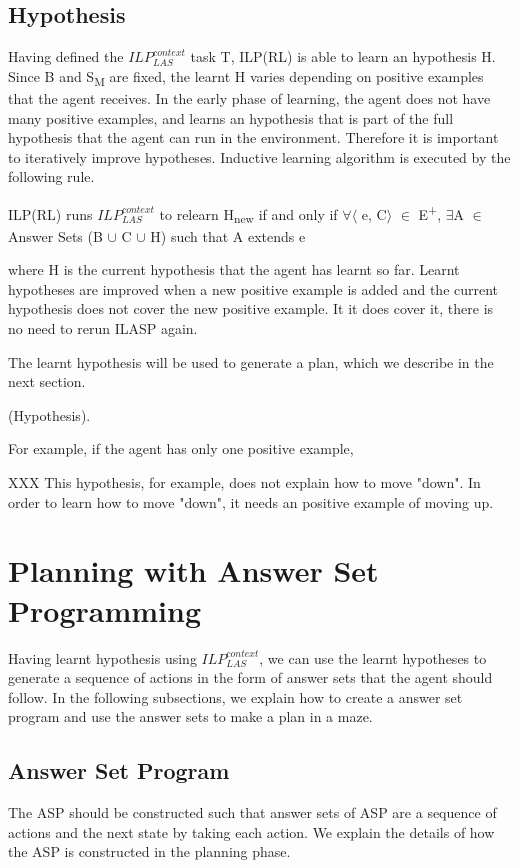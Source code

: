 \subsection{Hypothesis}
\label{sebsec:hypothesis}
Having defined the $ILP_{LAS}^{context}$ task T, ILP(RL) is able to learn an hypothesis H. 
Since B and S\textsubscript{M} are fixed, the learnt H varies depending on positive examples that the agent receives.
In the early phase of learning, the agent does not have many positive examples, and learns an hypothesis that is part of the full hypothesis that the agent can run in the environment.
Therefore it is important to iteratively improve hypotheses. Inductive learning algorithm is executed by the following rule.
\begin{defn}\label{def:ILASP_run}
ILP(RL) runs $ILP_{LAS}^{context}$ to relearn H\textsubscript{new} if and only if $\forall$$\langle$ e, C$\rangle$ $\in$ E\textsuperscript{+}, $\exists$A $\in$ Answer Sets (B $\cup$ C $\cup$ H) such that A extends e
\end{defn}
where H is the current hypothesis that the agent has learnt so far. 
Learnt hypotheses are improved when a new positive example is added and the current hypothesis does not cover the new positive example.
It it does cover it, there is no need to rerun ILASP again.

The learnt hypothesis will be used to generate a plan, which we describe in the next section.

\begin{examp} \normalfont (Hypothesis).

For example, if the agent has only one positive example,

XXX
This hypothesis, for example, does not explain how to move "down". In order to learn how to move "down", it needs an positive example of moving up.
\end{examp}

\section{Planning with Answer Set Programming}
\label{sec:planning}

Having learnt hypothesis using $ILP_{LAS}^{context}$, we can use the learnt hypotheses to generate a sequence of actions in the form of answer sets that the agent should follow.
In the following subsections, we explain how to create a answer set program and use the answer sets to make a plan in a maze.
\subsection{Answer Set Program}
\label{subsec:answer_set_program}
The ASP should be constructed such that answer sets of ASP are a sequence of actions and the next state by taking each action. 
We explain the details of how the ASP is constructed in the planning phase.

